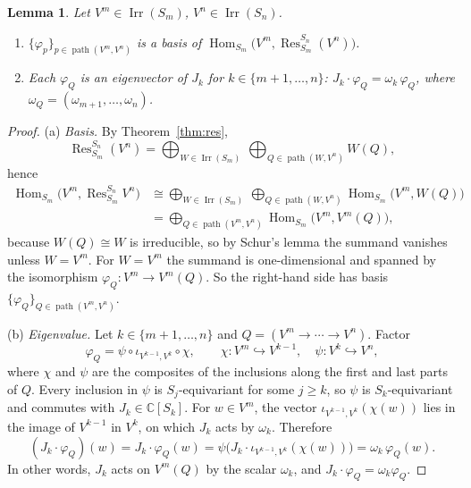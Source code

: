 \documentclass[11pt]{article}
\newtheorem{lemma}[theorem]{Lemma}
\theoremstyle{definition}
\theoremstyle{remark}
\newcommand{\C}{\mathbb{C}}
\DeclareMathOperator{\Irr}{Irr}
\DeclareMathOperator{\Res}{Res}
\DeclareMathOperator{\Hom}{Hom}
\DeclareMathOperator{\pth}{path}   %
\newcommand{\into}{\hookrightarrow}
\begin{document}
\begin{lemma}\label{lem:basis}
Let $V^m\in\Irr(S_m)$, $V^n\in\Irr(S_n)$.
\begin{enumerate}[label=(\alph*),nosep]
  \item $\{\varphi_p\}_{p\in\pth(V^m,V^n)}$ is a basis of
        $\Hom_{S_m}\!\bigl(V^m,\Res^{S_n}_{S_m}(V^n)\bigr)$.
  \item Each $\varphi_Q$ is an eigenvector of $J_k$ for
        $k\in\{m+1,\dots,n\}$: $J_k\cdot\varphi_Q=\omega_k\,\varphi_Q$, where
        $\omega_Q=(\omega_{m+1},\dots,\omega_n)$.
\end{enumerate}
\end{lemma}

\begin{proof}
(a) \emph{Basis.} By Theorem~\ref{thm:res},
\[
  \Res^{S_n}_{S_m}(V^n)=\bigoplus_{W\in\Irr(S_m)}\ \bigoplus_{Q\in\pth(W,V^n)}W(Q),
\]
hence
\begin{align*}
  \Hom_{S_m}\!\bigl(V^m,\Res^{S_n}_{S_m}V^n\bigr)
  &\cong\bigoplus_{W\in\Irr(S_m)}\ \bigoplus_{Q\in\pth(W,V^n)}
     \Hom_{S_m}\!\bigl(V^m,W(Q)\bigr)\\
  &=\bigoplus_{Q\in\pth(V^m,V^n)}\Hom_{S_m}\!\bigl(V^m,V^m(Q)\bigr),
\end{align*}
because $W(Q)\cong W$ is irreducible, so by Schur's lemma the summand vanishes
unless $W=V^m$. For $W=V^m$ the summand is one-dimensional and spanned by the
isomorphism $\varphi_Q\colon V^m\to V^m(Q)$. So the right-hand side has basis
$\{\varphi_Q\}_{Q\in\pth(V^m,V^n)}$.

\smallskip
(b) \emph{Eigenvalue.} Let $k\in\{m+1,\dots,n\}$ and
$Q=(V^m\to\cdots\to V^n)$. Factor
\[
  \varphi_Q=\psi\circ\iota_{V^{k-1},V^k}\circ\chi,
  \qquad
  \chi\colon V^m\into V^{k-1},\quad
  \psi\colon V^k\into V^n,
\]
where $\chi$ and $\psi$ are the composites of the inclusions along the first
and last parts of $Q$. Every inclusion in $\psi$ is $S_j$-equivariant for some
$j\ge k$, so $\psi$ is $S_k$-equivariant and commutes with $J_k\in\C[S_k]$.
For $w\in V^m$, the vector $\iota_{V^{k-1},V^k}(\chi(w))$ lies in the image of
$V^{k-1}$ in $V^k$, on which $J_k$ acts by $\omega_k$. Therefore
\[
  (J_k\cdot\varphi_Q)(w)=J_k\cdot\varphi_Q(w)
  =\psi\bigl(J_k\cdot\iota_{V^{k-1},V^k}(\chi(w))\bigr)
  =\omega_k\,\varphi_Q(w).
\]
In other words, $J_k$ acts on $V^m(Q)$ by the scalar $\omega_k$, and
$J_k\cdot\varphi_Q=\omega_k\varphi_Q$.
\end{proof}

\end{document}
